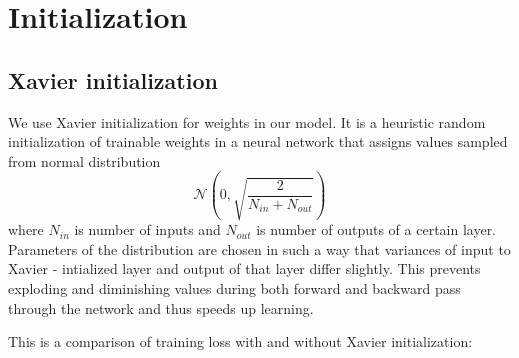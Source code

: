 \documentclass[licencjacka,en]{pracamgr}
\begin{document}
\section{Initialization}
\xavier

\subsection{Xavier initialization}
We use Xavier initialization \cite{XAVIER} for weights in our model. It is a heuristic random initialization of trainable weights in a neural network that assigns values sampled from normal distribution $$\mathcal{N}\left(0, \sqrt{\frac{2}{N_{in} + N_{out}}}\right)$$ where $N_{in}$ is number of inputs and $N_{out}$ is number of outputs of a certain layer. Parameters of the distribution are chosen in such a way that variances of input to Xavier - intialized layer and output of that layer differ slightly. This prevents exploding and diminishing values during both forward and backward pass through the network and thus speeds up learning.

This is a comparison of training loss with and without Xavier initialization:
\end{document}
